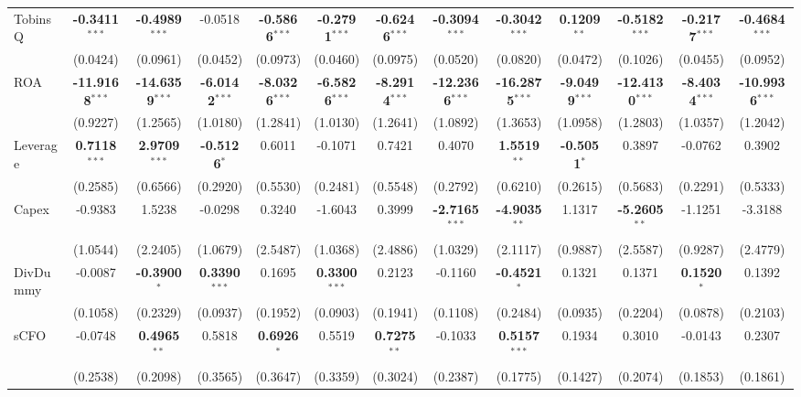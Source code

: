 \documentclass[11pt,a4paper]{article}
\begin{document}
\begin{table}[htbp]
\begin{tabular}{lcccccccccccc}
TobinsQ & \textbf{-0.3411}$^{***}$ & \textbf{-0.4989}$^{***}$ & -0.0518 & \textbf{-0.5866}$^{***}$ & \textbf{-0.2791}$^{***}$ & \textbf{-0.6246}$^{***}$ & \textbf{-0.3094}$^{***}$ & \textbf{-0.3042}$^{***}$ & \textbf{0.1209}$^{**}$ & \textbf{-0.5182}$^{***}$ & \textbf{-0.2177}$^{***}$ & \textbf{-0.4684}$^{***}$ \\
 & (0.0424) & (0.0961) & (0.0452) & (0.0973) & (0.0460) & (0.0975) & (0.0520) & (0.0820) & (0.0472) & (0.1026) & (0.0455) & (0.0952) \\
ROA & \textbf{-11.9168}$^{***}$ & \textbf{-14.6359}$^{***}$ & \textbf{-6.0142}$^{***}$ & \textbf{-8.0326}$^{***}$ & \textbf{-6.5826}$^{***}$ & \textbf{-8.2914}$^{***}$ & \textbf{-12.2366}$^{***}$ & \textbf{-16.2875}$^{***}$ & \textbf{-9.0499}$^{***}$ & \textbf{-12.4130}$^{***}$ & \textbf{-8.4034}$^{***}$ & \textbf{-10.9936}$^{***}$ \\
 & (0.9227) & (1.2565) & (1.0180) & (1.2841) & (1.0130) & (1.2641) & (1.0892) & (1.3653) & (1.0958) & (1.2803) & (1.0357) & (1.2042) \\
Leverage & \textbf{0.7118}$^{***}$ & \textbf{2.9709}$^{***}$ & \textbf{-0.5126}$^{*}$ & 0.6011 & -0.1071 & 0.7421 & 0.4070 & \textbf{1.5519}$^{**}$ & \textbf{-0.5051}$^{*}$ & 0.3897 & -0.0762 & 0.3902 \\
 & (0.2585) & (0.6566) & (0.2920) & (0.5530) & (0.2481) & (0.5548) & (0.2792) & (0.6210) & (0.2615) & (0.5683) & (0.2291) & (0.5333) \\
Capex & -0.9383 & 1.5238 & -0.0298 & 0.3240 & -1.6043 & 0.3999 & \textbf{-2.7165}$^{***}$ & \textbf{-4.9035}$^{**}$ & 1.1317 & \textbf{-5.2605}$^{**}$ & -1.1251 & -3.3188 \\
 & (1.0544) & (2.2405) & (1.0679) & (2.5487) & (1.0368) & (2.4886) & (1.0329) & (2.1117) & (0.9887) & (2.5587) & (0.9287) & (2.4779) \\
DivDummy & -0.0087 & \textbf{-0.3900}$^{*}$ & \textbf{0.3390}$^{***}$ & 0.1695 & \textbf{0.3300}$^{***}$ & 0.2123 & -0.1160 & \textbf{-0.4521}$^{*}$ & 0.1321 & 0.1371 & \textbf{0.1520}$^{*}$ & 0.1392 \\
 & (0.1058) & (0.2329) & (0.0937) & (0.1952) & (0.0903) & (0.1941) & (0.1108) & (0.2484) & (0.0935) & (0.2204) & (0.0878) & (0.2103) \\
sCFO & -0.0748 & \textbf{0.4965}$^{**}$ & 0.5818 & \textbf{0.6926}$^{*}$ & 0.5519 & \textbf{0.7275}$^{**}$ & -0.1033 & \textbf{0.5157}$^{***}$ & 0.1934 & 0.3010 & -0.0143 & 0.2307 \\
 & (0.2538) & (0.2098) & (0.3565) & (0.3647) & (0.3359) & (0.3024) & (0.2387) & (0.1775) & (0.1427) & (0.2074) & (0.1853) & (0.1861) \\

\end{tabular}
\end{table}
\end{document}
